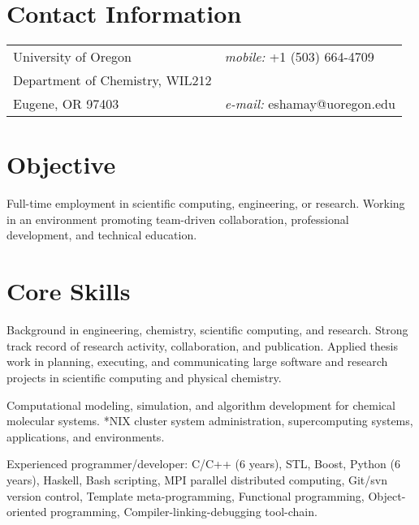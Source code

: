 \documentclass[margin,line]{res}
\begin{document}

\begin{resume}
\section{\sc Contact Information}
\vspace{.05in}
\begin{tabular}{@{}p{3.5in}p{3.5in}}
University of Oregon             		& {\it mobile:}  +1 (503) 664-4709\\
Department of Chemistry, WIL212         & \\
Eugene, OR 97403                    	& {\it e-mail:}  eshamay@uoregon.edu
\end{tabular}


\section{\sc Objective}
Full-time employment in scientific computing, engineering, or research. Working in an environment promoting team-driven collaboration, professional development, and technical education.


\section{\sc Core Skills} 
Background in engineering, chemistry, scientific computing, and research. Strong track record of research activity, collaboration, and publication. Applied thesis work in planning, executing, and communicating large software and research projects in scientific computing and physical chemistry.

\vspace*{-.1in}
Computational modeling, simulation, and algorithm development for chemical molecular systems. *NIX cluster system administration, supercomputing systems, applications, and environments.

\vspace*{-.1in}
Experienced programmer/developer: C/C++ (6 years), STL, Boost, Python (6 years), Haskell, Bash scripting, MPI parallel distributed computing, Git/svn version control, Template meta-programming, Functional programming, Object-oriented programming, Compiler-linking-debugging tool-chain.



\end{resume}
\end{document}
